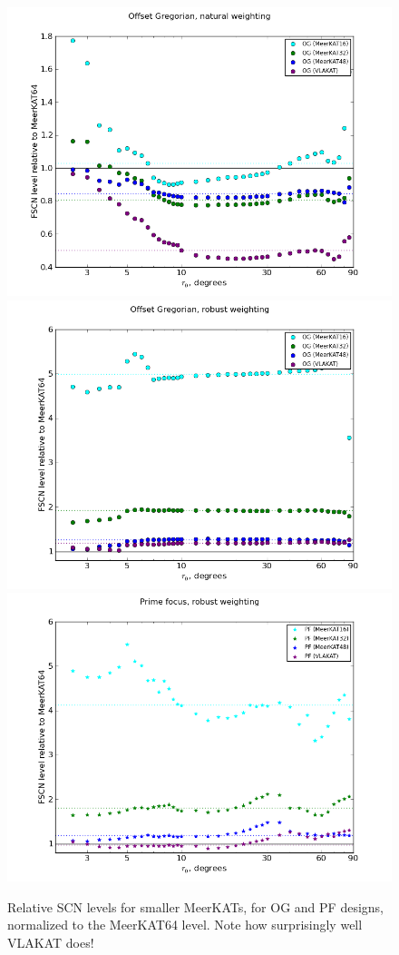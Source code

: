 \documentclass{aa}
\begin{document}
\begin{figure}
  \includegraphics[width=.33\textwidth]{cc-meerkatjes-ratio-og-nat}\hfill%
  \includegraphics[width=.33\textwidth]{cc-meerkatjes-ratio-og}\hfill%
  \includegraphics[width=.33\textwidth]{cc-meerkatjes-ratio-pf}
\caption{\label{fig:fscn-meerkatjes-relative}Relative SCN levels for smaller MeerKATs, for OG and PF designs, normalized to the MeerKAT64 level. Note how surprisingly well VLAKAT does!}

\end{figure}
\end{document}
